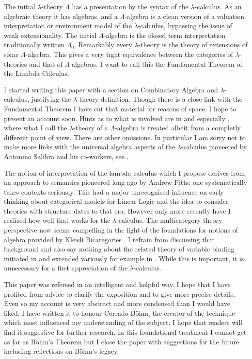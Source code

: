 \documentclass[12pt, amstex, amssymb]{article}
\begin{document}
The initial $\lambda$-theory $\Lambda$ has a presentation
by the syntax of the $\lambda$-calculus. As an algebraic theory
it has algebras, and
a $\Lambda$-algebra is a clean version of a
valuation interpretation or environment model 
of the $\lambda$-calculus, bypassing the issue of
weak extensionality. 
The initial $\Lambda$-algebra is the closed term
interpretation traditionally written $\Lambda_0$.
Remarkably every $\lambda$-theory
is the theory of extensions of some $\Lambda$-algebra.
This gives a very tight equivalence between
the categories of $\lambda$-theories and that
of $\Lambda$-algebras. I want to call this the Fundamental 
Theorem of the Lambda Calculus.

I started writing this paper with a section on Combinatory
Algebra and $\lambda$-calculus, justifying 
the $\lambda$-theory definition. Though there is a close link
with the Fundamental Theorem I have cut that material
for reasons of space. I hope to present an account soon.
Hints as to what is involved are in \cite{Freyd89}
and especially \cite{Sel02}, where what I
call the $\lambda$-theory of a $\Lambda$-algebra
is treated albeit from a completly different point of view.
There are other omissions. In particular I am sorry not
to make more links with the universal algebra aspects of
the $\lambda$-calculus pioneered by Antonino Salibra and his
co-workers, see \cite{MS06}.
 
The notion of interpretation of the lambda calculus which I 
propose derives from an approach to semantics pioneered 
long ago by Andrew Pitts: one systematically takes contexts seriously.
This had a major unrecognised influence on early thinking about
categorical models for Linear Logic \cite{BBPHa}
and the idea to consider theories with structure
dates to that era. However only more recently have 
I realised how well that works for the $\lambda$-calculus.
The multicategory theory perspective now seems compelling in the light of
the foundations for notions of algebra \cite{Hyl13} provided by
Kleisli Bicategories \cite{FGHW}. I refrain from
discussing that background and also say nothing 
about the related theory of variable binding initiated in
\cite{FPT99} and extended variously for example in
\cite{TP06a}. While this is important, 
it is unnecessary for a first
appreciation of the $\lambda$-calculus.

This paper was refereed in an intelligent and helpful way. I hope that
I have profited from advice to clarify the exposition and to
give more precise details. Even so my account is very abstract
and more condensed than I would have liked. I have 
written it to honour Corrado B\"{o}hm, the creator of the 
technique \cite{Bohm68} which most influenced my understanding 
of the subject.  I hope that readers will find it suggestive
for further research. In this foundational treatment I cannot 
get as far as B\"{o}hm's Theorem but I
close the paper with suggestions for the future
including reflections on B\"{o}hm's legacy.
\end{document}
